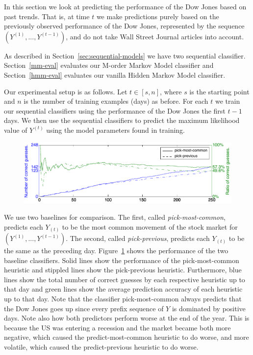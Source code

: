 \documentclass[10pt, twocolumn]{article}
\begin{document}
\begin{itemize}
In this section we look at predicting the performance of the Dow Jones based on past trends.
That is, at time $t$ we make predictions purely based on the previously observed performance of the Dow Jones, represented by the sequence $(Y^{(1)}, ..., Y^{(t-1)})$, and do not take Wall Street Journal articles into account.

As described in Section~\ref{sec:sequential-models} we have two sequential classifier.
Section~\ref{mm-eval} evaluates our M-order Markov Model classifier and Section~\ref{hmm-eval} evaluates our vanilla Hidden Markov Model classifier.

Our experimental setup is as follows.
Let $t\in{}[s,n]$, where $s$ is the starting point and $n$ is the number of training examples (days) as before.
For each $t$ we train our sequential classifiers using the performance of the Dow Jones the first $t-1$ days.
We then use the sequential classifiers to predict the maximum likelihood value of $Y^{(t)}$ using the model parameters found in training.

\begin{figure}
\center
\hspace{0.5cm}
\includegraphics[width=16cm]{experiments/seq_baseline.pdf}
\caption{}
\label{fig:seq-baseline}
\end{figure}

We use two baselines for comparison.
The first, called \emph{pick-most-common}, predicts each $Y_{(t)}$ to be the most common movement of the stock market for $(Y^{(1)}, ..., Y^{(t-1)})$.
The second, called \emph{pick-previous}, predicts each $Y_{(t)}$ to be the same as the preceding day.
Figure~\ref{fig:seq-baseline} shows the performance of the two baseline classifiers.
Solid lines show the performance of the pick-most-common heuristic and stippled lines show the pick-previous heuristic.
Furthermore, blue lines show the total number of correct guesses by each respective heuristic up to that day and green lines show the average prediction accuracy of each heuristic up to that day.
Note that the classifier pick-most-common always predicts that the Dow Jones goes up since every prefix sequence of $Y$ is dominated by positive days. 
Note also how both predictors perform worse at the end of the year.
This is because the US was entering a recession and the market became both more negative, which caused the predict-most-common heuristic to do worse, and more volatile, which caused the predict-previous heuristic to do worse.


\end{itemize}
\end{document}
